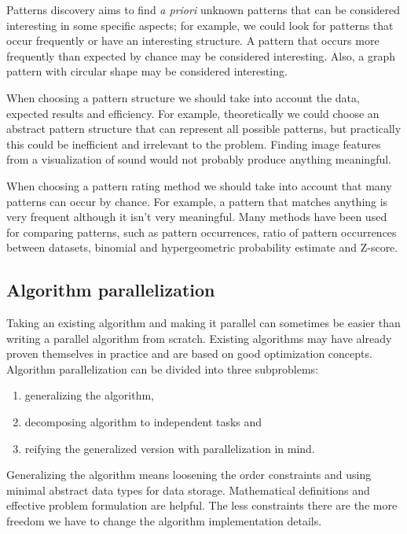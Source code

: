Patterns discovery aims to find \emph{a priori} unknown patterns that can be considered interesting in some specific aspects; for example, we could look for patterns that occur frequently or have an interesting structure. A pattern that occurs more frequently than expected by chance may be considered interesting. Also, a graph pattern with circular shape may be considered interesting.

When choosing a pattern structure we should take into account the data, expected results and efficiency. For example, theoretically we could choose an abstract pattern structure that can represent all possible patterns, but practically this could be inefficient and irrelevant to the problem. Finding image features from a visualization of sound would not probably produce anything meaningful.

When choosing a pattern rating method we should take into account that many patterns can occur by chance. For example, a pattern that matches anything is very frequent although it isn't very meaningful. Many methods have been used for comparing patterns, such as pattern occurrences, ratio of pattern occurrences between datasets, binomial and hypergeometric probability estimate and Z-score.

\subsection{Algorithm parallelization}

Taking an existing algorithm and making it parallel can sometimes be easier than writing a parallel algorithm from scratch. Existing algorithms may have already proven themselves in practice and are based on good optimization concepts. Algorithm parallelization can be divided into three subproblems:

\begin{enumerate}
	\item generalizing the algorithm,
	\item decomposing algorithm to independent tasks and
	\item reifying the generalized version with parallelization in mind.
\end{enumerate}

Generalizing the algorithm means loosening the order constraints and using minimal abstract data types for data storage. Mathematical definitions and effective problem formulation are helpful. The less constraints there are the more freedom we have to change the algorithm implementation details.

